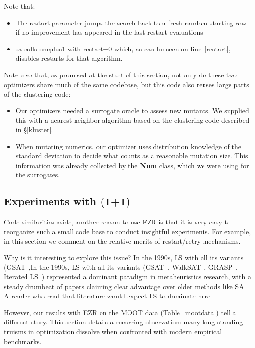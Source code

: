 \documentclass[AMA,STIX2COL]{WileyNJDv5}
\newcommand{\cls}[1]{%
  \setlength{\fboxsep}{1.5pt}%
  \colorbox{clsbg}{\sffamily\bfseries{#1}}%
}
\begin{document}
Note that:
\begin{itemize}
\item The \textsf{restart} parameter jumps the search back to a
fresh random starting row if no improvement has appeared in the
last \textsf{restart} evaluations.  
\item \textsf{sa} calls \textsf{oneplus1} with \textsf{restart=0}
which, as can be seen on line~\ref{restart}, disables restarts for
that algorithm.
\end{itemize}
Note also that, as promised at the start of this section, not only
do these two optimizers share much of the same codebase, but this
code also reuses large parts of the clustering code:
\begin{itemize}
\item Our optimizers needed a surrogate oracle to assess new
mutants. We supplied this with a nearest neighbor algorithm based
on the clustering code  described in \S\ref{kluster}.
\item When mutating numerics, our optimizer uses distribution
knowledge of the standard deviation to decide what counts as a
reasonable mutation size. This information was already collected
by the \cls{Num} class, which we were using for the surrogates.
\end{itemize}



 
\subsection{Experiments with (1+1)}\label{sec:opt-results}

 

Code similarities aside, another reason to use EZR is that it is
very easy to reorganize such a small code base to conduct insightful
experiments. For example, in this section we comment
on the relative merits of restart/retry mechanisms.


Why is it interesting to explore this issue?
In the 1990s, LS with all its variants (GSAT~\cite{gsat},In the 1990s, LS with all its variants (GSAT~\cite{gsat}, WalkSAT~\cite{walksat}, GRASP~\cite{grasp}, Iterated LS~\cite{ils})
represented a dominant paradigm in metaheuristics research, with
a steady drumbeat of papers claiming clear advantage over older
methods like SA A reader who
read that literature would expect LS to dominate here.

However, our results with EZR on the MOOT data
(Table~\ref{mootdata}) tell a different story. This section
details a recurring observation: many long-standing truisms
in optimization dissolve when confronted with modern
empirical benchmarks.
\end{document}
